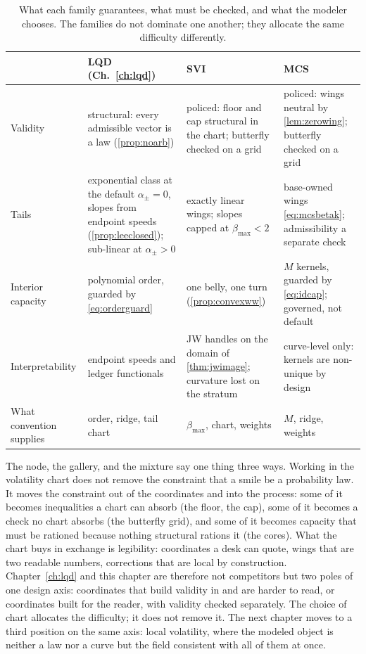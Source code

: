 \begin{table}[htbp]
\centering\small
\setlength{\tabcolsep}{5pt}
\renewcommand{\arraystretch}{1.25}
\begin{tabular}{@{}p{}p{}p{}p{}@{}}
\toprule
& LQD (Ch.~\ref{ch:lqd}) & SVI & MCS\\
\midrule
Validity & structural: every admissible vector is a law
(\cref{prop:noarb}) & policed: floor and cap structural in the chart;
butterfly checked on a grid & policed: wings neutral by
\cref{lem:zerowing}; butterfly checked on a grid\\
Tails & exponential class at the default $\alpha_\pm=0$, slopes from
endpoint speeds (\cref{prop:leeclosed}); sub-linear at $\alpha_\pm>0$
& exactly linear wings; slopes capped at
$\beta_{\max}<2$ & base-owned wings \eqref{eq:mcsbetak};
admissibility a separate check\\
Interior capacity & polynomial order, guarded by
\eqref{eq:orderguard} & one belly, one turn (\cref{prop:convexww}) &
$M$ kernels, guarded by \eqref{eq:idcap}; governed, not default\\
Interpretability & endpoint speeds and ledger functionals & JW handles
on the domain of \cref{thm:jwimage}; curvature lost on the stratum &
curve-level only: kernels are non-unique by design\\
What convention supplies & order, ridge, tail chart & $\beta_{\max}$,
chart, weights & $M$, ridge, weights\\
\bottomrule
\end{tabular}
\caption{What each family guarantees, what must be checked, and what
the modeler chooses.  The families do not dominate one another; they
allocate the same difficulty differently.}
\label{tab:svicontract}
\end{table}

The node, the gallery, and the mixture say one thing three ways.
Working in the volatility chart does not
remove the constraint that a smile be a probability law.  It moves the
constraint out of the coordinates and into the process: some of it
becomes inequalities a chart can absorb (the floor, the cap), some of
it becomes a check no chart absorbs (the butterfly grid), and some of
it becomes capacity that must be rationed because nothing structural
rations it (the cores).  What the chart buys in exchange is
legibility: coordinates a desk can quote, wings that are two readable
numbers, corrections that are local by construction.
Chapter~\ref{ch:lqd} and this chapter are therefore not competitors
but two poles of one design axis: coordinates that build validity in
and are harder to read, or coordinates built for the reader, with
validity checked separately.  The choice of chart allocates the
difficulty; it does not remove it.  The next chapter moves to a third
position on the same axis: local volatility, where the modeled object
is neither a law nor a curve but the field consistent with all of them
at once.
